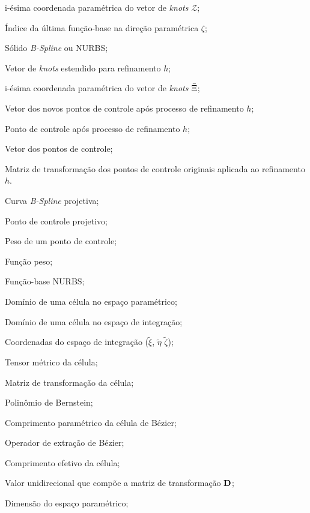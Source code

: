 \begin{simbolos}
  \item[$\zeta_i$] i-ésima coordenada paramétrica do vetor de \textit{knots} $\mathcal{Z}$;
  \item[$l$] Índice da última função-base na direção paramétrica $\zeta$;
  \item[$\mathbf{T}$] Sólido \textit {B-Spline} ou NURBS;
  \item[$\bar{\Xsi}$] Vetor de \textit{knots} estendido para refinamento $h$;
  \item[$\bar{\xsi_i}$] i-ésima coordenada paramétrica do vetor de \textit{knots} $\bar{\Xsi}$;
  \item[$\bar{\mathcal{B}}$] Vetor dos novos pontos de controle após processo de refinamento $h$;
  \item[$\bar{\CP}$] Ponto de controle após processo de refinamento $h$;
  \item[${\mathcal{B}}$] Vetor dos pontos de controle;
  \item[$\mathbf{T}$] Matriz de transformação dos pontos de controle originais aplicada ao refinamento $h$.
  \item[$\mathbf{C}^{w}$] Curva \textit{B-Spline} projetiva;
  \item[$\CP^{w}$] Ponto de controle projetivo;
  \item[$w$] Peso de um ponto de controle;
  \item[$W$] Função peso;
  \item[$R$] Função-base NURBS;
  \item[$\bar{\Omega}^{e}$] Domínio de uma célula no espaço paramétrico;
  \item[$\tilde{\Omega}^{e}$] Domínio de uma célula no espaço de integração;
  \item[$\boldsymbol{\tilde{\xsi}}$] Coordenadas do espaço de integração ($\tilde{\xi}$, $\tilde{\eta}$ $\tilde{\zeta}$);
  \item[$\matrixG$] Tensor métrico da célula;
  \item[$\matrixD$] Matriz de transformação da célula;
  \item[$B$] Polinômio de Bernstein;
  \item[$\Delta\hat{\xsi}$] Comprimento paramétrico da célula de Bézier;
  \item[$\matrixC$] Operador de extração de Bézier;
  \item[$\Delta\tilde{\xsi}$] Comprimento efetivo da célula;
  \item[$D_u$] Valor unidirecional que compõe a matriz de transformação $\matrixD$;
  \item[$n_{pd}$] Dimensão do espaço paramétrico;

\end{simbolos}
